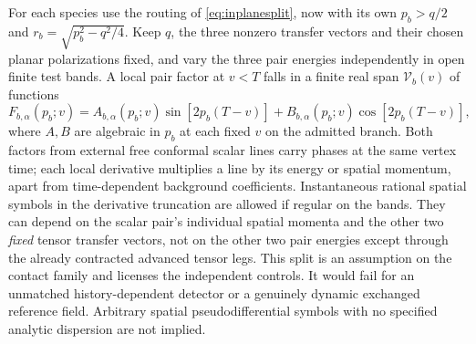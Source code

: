 For each species use the routing of \eqref{eq:inplanesplit}, now with its own \(p_b>q/2\) and \(r_b=\sqrt{p_b^2-q^2/4}\). Keep \(q\), the three nonzero transfer vectors and their chosen planar polarizations fixed, and vary the three pair energies independently in open finite test bands. A local pair factor at \(v<T\) falls in a finite real span \(\mathcal V_b(v)\) of functions
\begin{equation}
 F_{b,\alpha}(p_b;v)
 =A_{b,\alpha}(p_b;v)\sin[2p_b(T-v)]
  +B_{b,\alpha}(p_b;v)\cos[2p_b(T-v)] ,
 \label{eq:contact}
\end{equation}
where \(A,B\) are algebraic in \(p_b\) at each fixed \(v\) on the admitted branch. Both factors from external free conformal scalar lines carry phases at the same vertex time; each local derivative multiplies a line by its energy or spatial momentum, apart from time-dependent background coefficients. Instantaneous rational spatial symbols in the derivative truncation are allowed if regular on the bands. They can depend on the scalar pair's individual spatial momenta and the other two \emph{fixed} tensor transfer vectors, not on the other two pair energies except through the already contracted advanced tensor legs. This split is an assumption on the contact family and licenses the independent controls. It would fail for an unmatched history-dependent detector or a genuinely dynamic exchanged reference field. Arbitrary spatial pseudodifferential symbols with no specified analytic dispersion are not implied.

